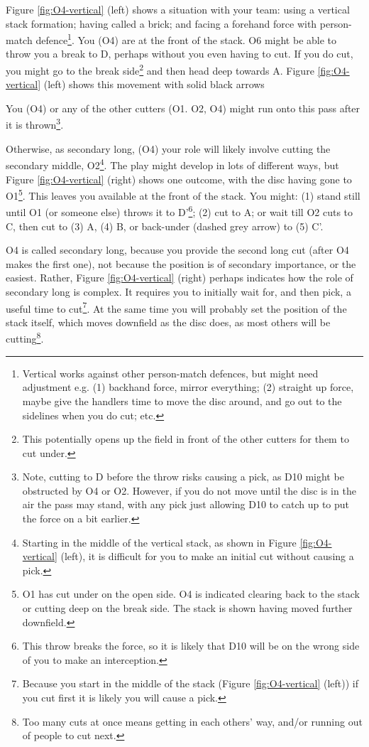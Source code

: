 \documentclass{tufte-handout}
\begin{document}
Figure \ref{fig:O4-vertical} (left) shows 
a situation 
with 
your team: 
using 
a vertical stack formation; 
having called a brick; and
facing a 
forehand force with 
person-match defence\footnote{
Vertical works
against other person-match defences, 
but might need 
adjustment e.g. 
(1) backhand force,
mirror everything;
(2) straight up force, 
maybe give the handlers 
time to move the disc around, 
and go out to the sidelines
when you do cut; etc.}. 
You (O4) 
are at the front 
of the stack.
O6 might be able 
to throw you
a break
to D, 
perhaps without you
even having to cut. 
If you do cut, 
you might 
go to the break side\footnote{ 
This potentially opens 
up the field in front of 
the other cutters 
for them to cut under.} 
and then head deep towards A. 
Figure \ref{fig:O4-vertical} (left) 
shows this movement with 
solid black arrows


You 
(O4)
or any of the other cutters
(O1. O2, O4) 
might run onto 
this pass 
after it is thrown\footnote{
Note, cutting to D 
before the throw 
risks causing a pick, 
as D10 
might be obstructed
 by O4 
 or O2. 
 However, 
 if you do not move 
 until the disc is in the air
 the pass may stand,
 with any pick 
 just allowing 
 D10 to
 catch up 
 to put the force on 
 a bit earlier.}.

Otherwise, 
as secondary long, 
(O4) 
your role 
will likely 
involve cutting 
the secondary middle, O2\footnote{
Starting
in the middle of the vertical stack,
as shown in 
Figure \ref{fig:O4-vertical} (left),
it is difficult for 
you to make 
an initial cut 
without causing 
a pick.}.
The play might develop 
in lots of different ways, 
but
Figure \ref{fig:O4-vertical} (right) shows 
one outcome, 
with the disc 
having gone 
to O1\footnote{
O1 has cut under 
on the open side.
O4 is indicated 
clearing 
back to the stack 
or cutting 
deep on 
the break side. 
The stack is shown having 
moved further downfield.}. 
This leaves 
you 
available 
at the front of the stack. 
You might: 
(1) stand still until O1
(or someone else)  
throws it 
to D'\footnote{
This throw 
breaks the force, 
so it is likely 
that D10 will 
be on the wrong side 
of you to make an interception.};
(2) cut to A;
or wait till O2 
cuts to C, 
then cut to (3) A,
(4) B, or 
back-under 
(dashed grey arrow) 
to (5) C'.  

O4 is called secondary long, 
because you provide the second 
long cut 
(after O4 makes the first one), 
not 
because the position 
is of secondary importance, 
or the easiest. 
Rather, 
Figure \ref{fig:O4-vertical} (right)
perhaps indicates 
how 
the role of 
secondary long 
is complex. 
It requires you to  
initially wait for, 
and then pick, 
a useful time to cut\footnote{
Because you start 
in the middle of the stack 
(Figure \ref{fig:O4-vertical} (left)) 
if you cut first it is likely you will 
cause a pick.}. 
At the same time
you will probably  
set the position 
of the stack itself,
which moves downfield 
as the disc does, 
as most others 
will be  
cutting\footnote{
Too many cuts at once 
means getting 
in each others' way, 
and/or running out of people
to cut next.}. 
\end{document}
